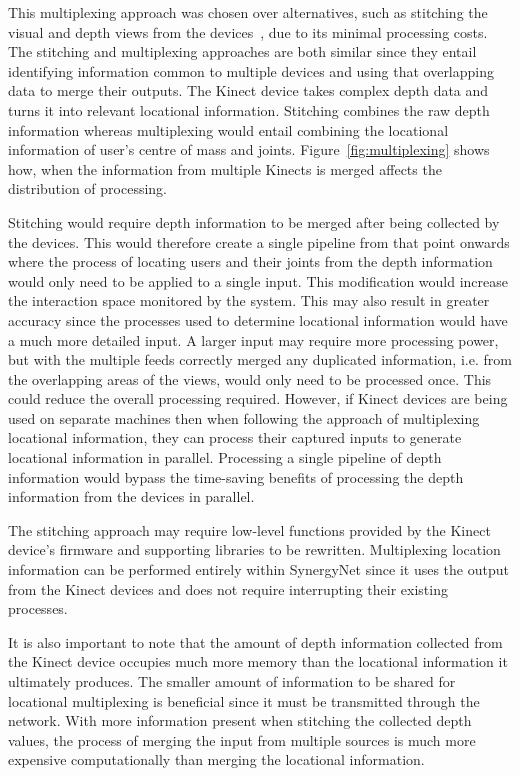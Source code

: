 \documentclass[link]{IWCOMP}
\begin{document}
This multiplexing approach was chosen over alternatives, such as stitching the visual and depth views from the devices~\cite{Dubois2011}, due to its minimal processing costs.
The stitching and multiplexing approaches are both similar since they entail identifying information common to multiple devices and using that overlapping data to merge their outputs.
The Kinect device takes complex depth data and turns it into relevant locational information.
Stitching combines the raw depth information whereas multiplexing would entail combining the locational information of user's centre of mass and joints.
Figure~\ref{fig:multiplexing} shows how, when the information from multiple Kinects is merged affects the distribution of processing.

Stitching would require depth information to be merged after being collected by the devices.
This would therefore create a single pipeline from that point onwards where the process of locating users and their joints from the depth information would only need to be applied to a single input.
This modification would increase the interaction space monitored by the system.
This may also result in greater accuracy since the processes used to determine locational information would have a much more detailed input.
A larger input may require more processing power, but with the multiple feeds correctly merged any duplicated information, i.e. from the overlapping areas of the views, would only need to be processed once.
This could reduce the overall processing required.
However, if Kinect devices are being used on separate machines then when following the approach of multiplexing locational information, they can process their captured inputs to generate locational information in parallel.
Processing a single pipeline of depth information would bypass the time-saving benefits of processing the depth information from the devices in parallel.

The stitching approach may require low-level functions provided by the Kinect device's firmware and supporting libraries to be rewritten.
Multiplexing location information can be performed entirely within SynergyNet since it uses the output from the Kinect devices and does not require interrupting their existing processes.

It is also important to note that the amount of depth information collected from the Kinect device occupies much more memory than the locational information it ultimately produces.
The smaller amount of information to be shared for locational multiplexing is beneficial since it must be transmitted through the network.
With more information present when stitching the collected depth values, the process of merging the input from multiple sources is much more expensive computationally than merging the locational information.
\end{document}
